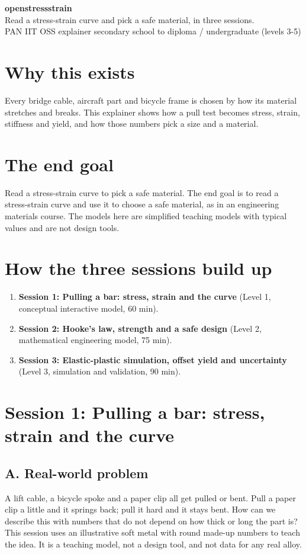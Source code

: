 \documentclass[11pt,a4paper]{article}
\begin{document}
\begin{center}{\LARGE\bfseries openstressstrain}\\[0.4em]{\large Read a stress-strain curve and pick a safe material, in three sessions.}\\[0.2em]\small PAN IIT OSS explainer \textbullet{} secondary school to diploma / undergraduate (levels 3-5)\end{center}

\section*{Why this exists}
Every bridge cable, aircraft part and bicycle frame is chosen by how its material stretches and breaks. This explainer shows how a pull test becomes stress, strain, stiffness and yield, and how those numbers pick a size and a material.

\section*{The end goal}
Read a stress-strain curve to pick a safe material. The end goal is to read a stress-strain curve and use it to choose a safe material, as in an engineering materials course. The models here are simplified teaching models with typical values and are not design tools.

\section*{How the three sessions build up}
\begin{enumerate}[nosep]
\item \textbf{Session 1: Pulling a bar: stress, strain and the curve} (Level 1, conceptual interactive model, 60 min).
\item \textbf{Session 2: Hooke's law, strength and a safe design} (Level 2, mathematical engineering model, 75 min).
\item \textbf{Session 3: Elastic-plastic simulation, offset yield and uncertainty} (Level 3, simulation and validation, 90 min).
\end{enumerate}

\section{Session 1: Pulling a bar: stress, strain and the curve}

\subsection*{A. Real-world problem}
A lift cable, a bicycle spoke and a paper clip all get pulled or bent. Pull a paper clip a little and it springs back; pull it hard and it stays bent. How can we describe this with numbers that do not depend on how thick or long the part is? This session uses an illustrative soft metal with round made-up numbers to teach the idea. It is a teaching model, not a design tool, and not data for any real alloy.
\end{document}
